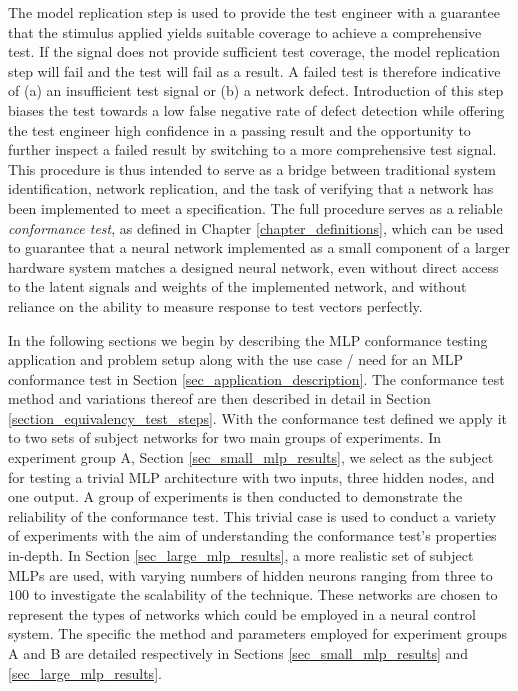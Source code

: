 The model replication step is used to provide the test engineer with a guarantee that the stimulus applied yields suitable coverage to achieve a comprehensive test.  If the signal does not provide sufficient test coverage, the model replication step will fail and the test will fail as a result.  A failed test is therefore indicative of (a) an insufficient test signal or (b) a network defect. Introduction of this step biases the test towards a low false negative rate of defect detection while offering the test engineer high confidence in a passing result and the opportunity to further inspect a failed result by switching to a more comprehensive test signal. This procedure is thus intended to serve as a bridge between traditional system identification, network replication, and the task of verifying that a network has been implemented to meet a specification.  The full procedure serves as a reliable \textit{conformance test}, as defined in Chapter \ref{chapter_definitions}, which can be used to guarantee that a neural network implemented as a small component of a larger hardware system matches a designed neural network, even without direct access to the latent signals and weights of the implemented network, and without reliance on the ability to measure response to test vectors perfectly.

In the following sections we begin by describing the MLP conformance testing application and
problem setup along with the use case / need for
an MLP conformance test in Section \ref{sec_application_description}.  The conformance test
method and variations thereof are then described in detail in Section \ref{section_equivalency_test_steps}.  With the conformance
test defined we apply it to two sets of subject networks for two main groups of experiments.  In experiment
group A, Section \ref{sec_small_mlp_results}, we select as the subject for testing a trivial MLP architecture
with two inputs, three hidden nodes, and one output.  A group of experiments is then conducted to demonstrate
the reliability of the conformance test.  This trivial case is used to conduct a variety of experiments with
the aim of understanding the conformance test's properties in-depth.  In Section \ref{sec_large_mlp_results},
a more realistic set of subject MLPs are used, with varying numbers of hidden neurons ranging from three to $100$
to investigate the scalability of the technique.  These networks are chosen to represent the types of networks
which could be employed in a neural control system.
The specific the method and parameters employed for experiment groups A and B are detailed respectively
in Sections \ref{sec_small_mlp_results} and \ref{sec_large_mlp_results}.

